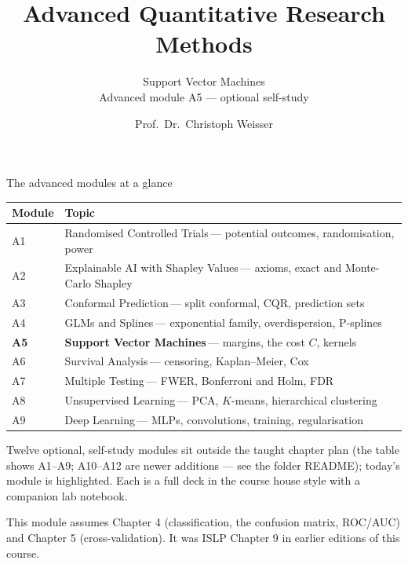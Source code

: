 \documentclass[aspectratio=169,11pt]{beamer}
\title{Advanced Quantitative Research Methods}
\subtitle{Support Vector Machines\\[2pt]{\small Advanced module A5 --- optional self-study}}
\author{Prof.\ Dr.\ Christoph Weisser}
\date{}\graphicspath{{images/}}
\begin{document}
\begin{frame}[plain]\titlepage\end{frame}

\begin{frame}{The advanced modules at a glance}
  \vspace{-1.5mm}
  \begin{center}
  \scriptsize
  \setlength{\tabcolsep}{5pt}
  \renewcommand{\arraystretch}{1.30}
  \begin{tabular}{@{\hspace{2pt}}l >{\raggedright\arraybackslash}p{}@{\hspace{2pt}}}
    \toprule
    \textbf{Module} & \textbf{Topic} \\
    \midrule
     {\color{accent}A1} & Randomised Controlled Trials\,{\color{black!45}--- potential outcomes, randomisation, power} \\
    \rowcolor{black!3} {\color{accent}A2} & Explainable AI with Shapley Values\,{\color{black!45}--- axioms, exact and Monte-Carlo Shapley} \\
     {\color{accent}A3} & Conformal Prediction\,{\color{black!45}--- split conformal, CQR, prediction sets} \\
    \rowcolor{black!3} {\color{accent}A4} & GLMs and Splines\,{\color{black!45}--- exponential family, overdispersion, P-splines} \\
    \rowcolor{accent!18} \textbf{A5} & \textbf{Support Vector Machines}\,{\color{accent!75!black}--- margins, the cost $C$, kernels} \\
    \rowcolor{black!3} {\color{accent}A6} & Survival Analysis\,{\color{black!45}--- censoring, Kaplan--Meier, Cox} \\
     {\color{accent}A7} & Multiple Testing\,{\color{black!45}--- FWER, Bonferroni and Holm, FDR} \\
    \rowcolor{black!3} {\color{accent}A8} & Unsupervised Learning\,{\color{black!45}--- PCA, $K$-means, hierarchical clustering} \\
     {\color{accent}A9} & Deep Learning\,{\color{black!45}--- MLPs, convolutions, training, regularisation} \\
    \bottomrule
  \end{tabular}
  \end{center}
  \vspace{2mm}
  {\scriptsize Twelve optional, self-study modules sit outside the taught
  chapter plan (the table shows A1--A9; A10--A12 are newer additions --- see the folder README); today's module is highlighted. Each is a full deck in the course
  house style with a companion lab notebook.\par\medskip This module assumes Chapter 4 (classification, the confusion matrix, ROC/AUC) and Chapter 5 (cross-validation). It was ISLP Chapter 9 in earlier editions of this course.}
\end{frame}
\end{document}
